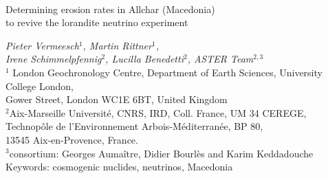 \documentclass[titlepage]{article}
\begin{document}
\linenumbers

\begin{titlepage}
\centering
  
~\vfill

\begin{huge}
  Determining erosion rates in Allchar (Macedonia)\\ to revive the
  lorandite neutrino experiment
\end{huge}

\vfill

\begin{large}
  
\textit{Pieter Vermeesch$^1$, Martin Rittner$^1$,}\\
\textit{Irene Schimmelpfennig$^2$, Lucilla Benedetti$^2$, ASTER Team$^{2,3}$} \\
\vspace{1cm}
$^1$ London Geochronology Centre, Department of Earth Sciences, University College London,\\
Gower Street, London WC1E 6BT, United Kingdom\\
\vspace{0.5cm}
$^2$Aix-Marseille Universit\'{e}, CNRS, IRD, Coll. France, UM 34 CEREGE, \\
Technop\^{o}le de l'Environnement Arbois-M\'{e}diterran\'{e}e, BP 80, \\
13545 Aix-en-Provence, France.\\
\vspace{0.5cm}
$^3$consortium: Georges Auma\^{i}tre, Didier Bourl\`{e}s and Karim Keddadouche\\
\vspace{1cm}
Keywords: cosmogenic nuclides, neutrinos, Macedonia

\end{large}

\vfill
  
\end{titlepage}

\end{document}
